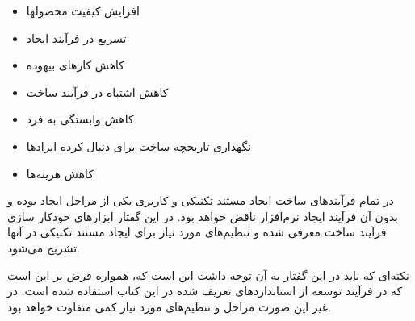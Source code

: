 \begin{itemize}
  \item افزایش کیفیت محصولها
  \item تسریع در فرآیند ایجاد
  \item کاهش کارهای بیهوده
  \item کاهش اشتباه در فرآیند ساخت
  \item کاهش وابستگی به فرد
  \item نگهداری تاریحچه ساخت برای دنبال کرده ایرادها
  \item کاهش هزینه‌ها
\end{itemize}

% 
% 
% 
% 

در تمام فرآیندهای ساخت ایجاد مستند تکنیکی و کاربری یکی از مراحل ایجاد بوده و
بدون آن فرآیند ایجاد نرم‌افزار ناقض خواهد بود. در این گفتار ابزارهای خودکار سازی
فرآیند ساخت معرفی شده و تنظیم‌های مورد نیاز برای ایجاد مستند تکنیکی در آنها
تشریج می‌شود.

نکته‌ای که باید در این گفتار به آن توجه داشت این است که، همواره فرض بر این است
که در فرآیند توسعه از استانداردهای تعریف شده در این کتاب استفاده شده است. در غیر
این صورت مراحل و تنظیم‌های مورد نیاز کمی متفاوت خواهد بود.




% 

